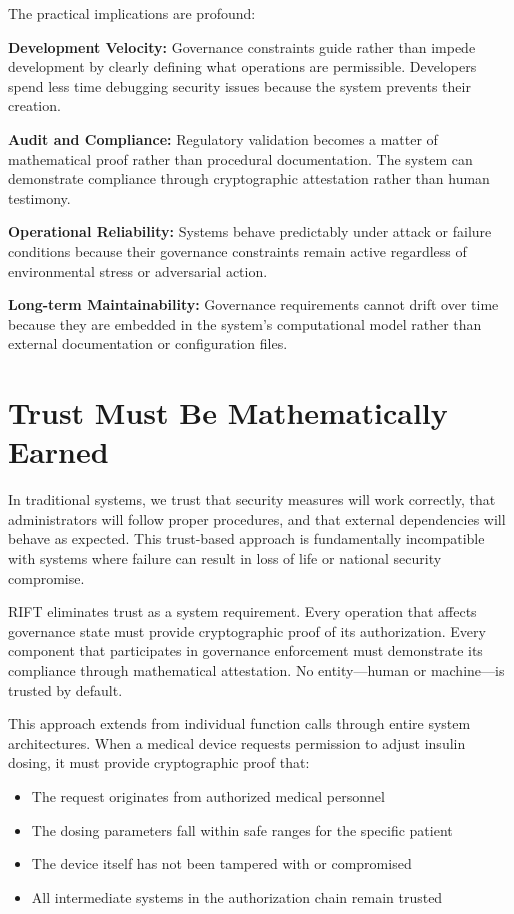 The practical implications are profound:

\textbf{Development Velocity:} Governance constraints guide rather than impede development by clearly defining what operations are permissible. Developers spend less time debugging security issues because the system prevents their creation.

\textbf{Audit and Compliance:} Regulatory validation becomes a matter of mathematical proof rather than procedural documentation. The system can demonstrate compliance through cryptographic attestation rather than human testimony.

\textbf{Operational Reliability:} Systems behave predictably under attack or failure conditions because their governance constraints remain active regardless of environmental stress or adversarial action.

\textbf{Long-term Maintainability:} Governance requirements cannot drift over time because they are embedded in the system's computational model rather than external documentation or configuration files.

\section*{Trust Must Be Mathematically Earned}

In traditional systems, we trust that security measures will work correctly, that administrators will follow proper procedures, and that external dependencies will behave as expected. This trust-based approach is fundamentally incompatible with systems where failure can result in loss of life or national security compromise.

RIFT eliminates trust as a system requirement. Every operation that affects governance state must provide cryptographic proof of its authorization. Every component that participates in governance enforcement must demonstrate its compliance through mathematical attestation. No entity—human or machine—is trusted by default.

This approach extends from individual function calls through entire system architectures. When a medical device requests permission to adjust insulin dosing, it must provide cryptographic proof that:
\begin{itemize}
\item The request originates from authorized medical personnel
\item The dosing parameters fall within safe ranges for the specific patient
\item The device itself has not been tampered with or compromised
\item All intermediate systems in the authorization chain remain trusted
\end{itemize}

